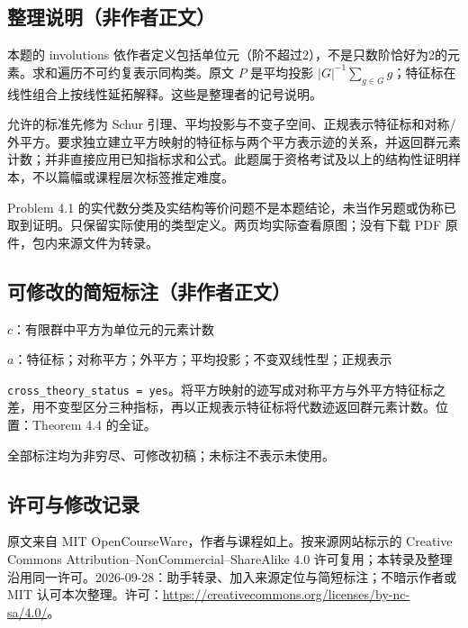 \documentclass[UTF8,11pt]{ctexart}
\theoremstyle{definition}
\begin{document}
\subsection*{整理说明（非作者正文）}
本题的 involutions 依作者定义包括单位元（阶不超过2），不是只数阶恰好为2的元素。求和遍历不可约复表示同构类。原文 $P$ 是平均投影 $|G|^{-1}\sum_{g\in G}g$；特征标在线性组合上按线性延拓解释。这些是整理者的记号说明。

允许的标准先修为 Schur 引理、平均投影与不变子空间、正规表示特征标和对称/外平方。要求独立建立平方映射的特征标与两个平方表示迹的关系，并返回群元素计数；并非直接应用已知指标求和公式。此题属于资格考试及以上的结构性证明样本，不以篇幅或课程层次标签推定难度。

Problem 4.1 的实代数分类及实结构等价问题不是本题结论，未当作另题或伪称已取到证明。只保留实际使用的类型定义。两页均实际查看原图；没有下载 PDF 原件，包内来源文件为转录。
\subsection*{可修改的简短标注（非作者正文）}
$c$：有限群中平方为单位元的元素计数

$a$：特征标；对称平方；外平方；平均投影；不变双线性型；正规表示

\texttt{cross\_theory\_status = yes}。将平方映射的迹写成对称平方与外平方特征标之差，用不变型区分三种指标，再以正规表示特征标将代数迹返回群元素计数。位置：Theorem 4.4 的全证。

全部标注均为非穷尽、可修改初稿；未标注不表示未使用。
\subsection*{许可与修改记录}
原文来自 MIT OpenCourseWare，作者与课程如上。按来源网站标示的 Creative Commons Attribution--NonCommercial--ShareAlike 4.0 许可复用；本转录及整理沿用同一许可。2026-09-28：助手转录、加入来源定位与简短标注；不暗示作者或 MIT 认可本次整理。许可：\url{https://creativecommons.org/licenses/by-nc-sa/4.0/}。
\end{document}
